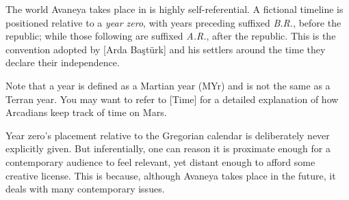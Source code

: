 
\startlines
The world Avaneya takes place in is highly self-referential. A fictional timeline is positioned relative to a {\it year zero}, with years preceding suffixed {\it B.R.}, before the republic; while those following are suffixed {\it A.R.}, after the republic. This is the convention adopted by [Arda Baştürk] and his settlers around the time they declare their independence.

Note that a year is defined as a Martian year (MYr) and is not the same as a Terran year. You may want to refer to [Time] for a detailed explanation of how Arcadians keep track of time on Mars.

Year zero's placement relative to the Gregorian calendar is deliberately never explicitly given. But inferentially, one can reason it is proximate enough for a contemporary audience to feel relevant, yet distant enough to afford some creative license. This is because, although Avaneya takes place in the future, it deals with many contemporary issues.
\crlf

\page 
\page 
\page 
\page 
\page 
\page 

\stoplines

\StopChapter

